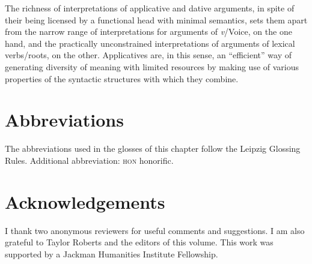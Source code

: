 \documentclass[output=paper,colorlinks,citecolor=brown,modfonts,nonflat]{langsci/langscibook}
\begin{document}
The richness of interpretations of applicative and dative arguments, in spite of their being licensed by a functional head with minimal semantics, sets them apart from the narrow range of interpretations for arguments of \textit{v}/Voice, on the one hand, and the practically unconstrained interpretations of arguments of lexical verbs/roots, on the other. Applicatives are, in this sense, an “efficient” way of generating diversity of meaning with limited resources by making use of various properties of the syntactic structures with which they combine.


\section*{Abbreviations}
The abbreviations used in the glosses of this chapter follow the Leipzig Glossing Rules. Additional abbreviation: \textsc{hon} honorific.


\section*{Acknowledgements}

I thank two anonymous reviewers for useful comments and suggestions. I am also grateful to Taylor Roberts and the editors of this volume. This work was supported by a Jackman Humanities Institute Fellowship.

\sloppy\printbibliography[heading=subbibliography,notkeyword=this]
\end{document}
